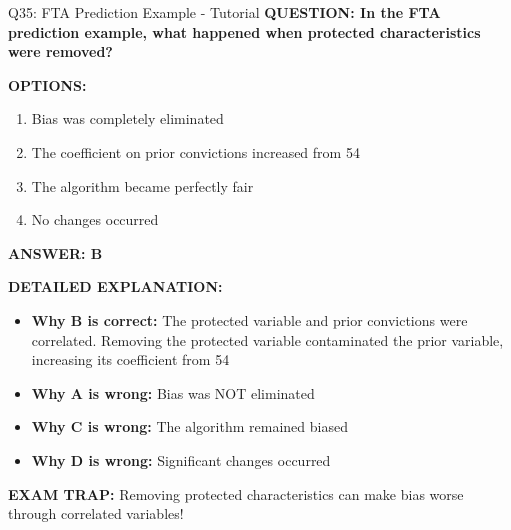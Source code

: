 \documentclass[8pt]{beamer}
\begin{document}
	\begin{frame}{Q35: FTA Prediction Example - Tutorial}
		\fontsize{6.5}{7.5}\selectfont
		\textbf{QUESTION: In the FTA prediction example, what happened when protected characteristics were removed?}
		
		\vspace{0.1cm}
		\textbf{OPTIONS:}
		\begin{enumerate}
			\item Bias was completely eliminated
			\item The coefficient on prior convictions increased from 54%
			\item The algorithm became perfectly fair
			\item No changes occurred
		\end{enumerate}
		
		\vspace{0.1cm}
		\textcolor{myblue}{\textbf{ANSWER: B}}
		
		\vspace{0.1cm}
		\textbf{DETAILED EXPLANATION:}
		\begin{itemize}
			\item \textbf{Why B is correct:} The protected variable and prior convictions were correlated. Removing the protected variable contaminated the prior variable, increasing its coefficient from 54%
			\item \textbf{Why A is wrong:} Bias was NOT eliminated
			\item \textbf{Why C is wrong:} The algorithm remained biased
			\item \textbf{Why D is wrong:} Significant changes occurred
		\end{itemize}
		
		\textcolor{myred}{\textbf{EXAM TRAP:}} Removing protected characteristics \textcolor{myblue}{can make bias worse} through correlated variables!
	\end{frame}
	
\end{document}
